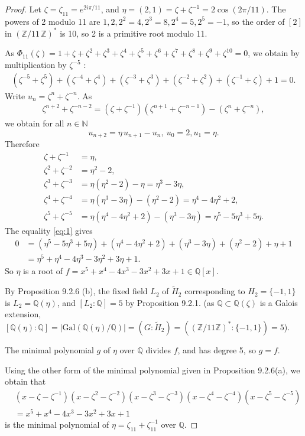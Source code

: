 \documentclass[11pt,a4paper]{article}
\newcommand{\Q}{\mathbb{Q}}
\newcommand{\Z}{\mathbb{Z}}
\newcommand{\N}{\mathbb{N}}
\newcommand{\Gal}{\mathrm{Gal}}
\begin{document}
\begin{proof}
Let $\zeta = \zeta_{11} = e^{2i\pi/11}$, and $\eta = (2,1) = \zeta + \zeta^{-1} = 2 \cos(2\pi/11)$. 
The powers of 2 modulo 11 are $1,2,2^2=4,2^3 =8, 2^4=5,2^5=-1$, so the order of $[2]$ in $(\Z/11\, \Z)^*$ is 10, so 2 is a primitive root modulo 11.

As $\Phi_{11}(\zeta) = 1+\zeta+\zeta^{2}+\zeta^{3}+\zeta^{4}+\zeta^{5}+\zeta^{6}+\zeta^{7}+\zeta^{8}+\zeta^{9}+\zeta^{10}=0$, we obtain by multiplication by $\zeta^{-5}$ :
\begin{align}
(\zeta^{-5} + \zeta^5)+(\zeta^{-4} + \zeta^4)+(\zeta^{-3} + \zeta^3)+(\zeta^{-2} + \zeta^2)+(\zeta^{-1} + \zeta) + 1=0. \label{eq:1}
\end{align}
Write $u_n = \zeta^n+\zeta^{-n}$. As 
\begin{align*}
\zeta^{n+2} + \zeta^{-n-2} = (\zeta+\zeta^{-1})(\zeta^{n+1}+\zeta^{-n-1}) - (\zeta^n+\zeta^{-n}),
\end{align*}
we obtain for all $n\in \N$
$$u_{n+2} = \eta \,u_{n+1} - u_n, \ u_0 = 2,u_1 = \eta.$$
Therefore
\begin{align*}
\zeta+\zeta^{-1} &= \eta,\\
\zeta^2+\zeta^{-2} &= \eta^2-2,\\
\zeta^3+\zeta^{-3} &=\eta(\eta^2-2)-\eta = \eta^3-3\eta,\\
\zeta^4+\zeta^{-4} &=\eta(\eta^3-3\eta) - (\eta^2-2) = \eta^4-4\eta^2+2,\\
\zeta^5+\zeta^{-5} &=\eta(\eta^4-4\eta^2+2)-(\eta^3-3\eta) = \eta^5-5\eta^3+5\eta.
\end{align*}
The equality \eqref{eq:1} gives
\begin{align*}
0 &= (\eta^5-5\eta^3+5\eta)+(\eta^4-4\eta^2+2)+(\eta^3-3\eta)+(\eta^2-2)+\eta+1\\
&=\eta^5+\eta^4-4\eta^3 - 3 \eta^2+3\eta + 1.
\end{align*}
So $\eta$ is a root of $f= x^5+x^4-4x^3-3x^2+3x+1 \in \Q[x]$.

By Proposition 9.2.6 (b), the fixed field $L_2$ of $\tilde{H}_2$ corresponding to $H_2 = \{-1,1\}$ is $L_2 = \Q(\eta)$, and $[L_2:\Q] = 5$ by Proposition 9.2.1.
(as $\Q \subset \Q(\zeta)$ is a Galois extension, $[\Q(\eta):\Q] =\vert \Gal(\Q(\eta)/\Q) \vert=  (G:\tilde{H}_2) =((\Z/11\Z)^* : \{-1,1\}) = 5$).

The minimal polynomial $g$ of $\eta$ over $\Q$ divides $f$, and has degree 5, so $g = f$.

Using the other form of the minimal polynomial given in Proposition 9.2.6(a), we obtain that
\begin{align*}
&(x-\zeta-\zeta^{-1})(x-\zeta^{2}-\zeta^{-2})(x-\zeta^{3}-\zeta^{-3})(x-\zeta^{4}-\zeta^{-4})(x-\zeta^{5}-\zeta^{-5}) \\
&=x^5+x^4-4x^3-3x^2+3x+1
\end{align*}
is the minimal polynomial of $\eta = \zeta_{11}+ \zeta_{11}^{-1}$ over $\Q$.
\end{proof}
\end{document}
